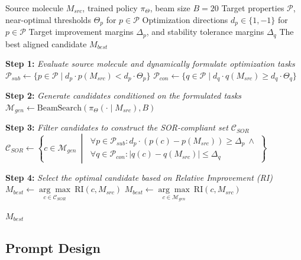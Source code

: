 \documentclass[11pt]{article}
\begin{document}
\begin{algorithm*}[t]
\caption{Candidate Selection}
\label{alg:beam_search}
\begin{algorithmic}[1]
\Require Source molecule $M_{src}$, trained policy $\pi_\Theta$, beam size $B=20$
\Require Target properties $\mathcal{P}$, near-optimal thresholds $\Theta_p$ for $p \in \mathcal{P}$
\Require Optimization directions $d_p \in \{1, -1\}$ for $p \in \mathcal{P}$ 
\Require Target improvement margins $\Delta_p$, and stability tolerance margins $\Delta_q$
\Ensure The best aligned candidate $M_{best}$

\State \textbf{Step 1:} \textit{Evaluate source molecule and dynamically formulate optimization tasks}
\State $\mathcal{P}_{sub} \leftarrow \{ p \in \mathcal{P} \mid d_p \cdot p(M_{src}) < d_p \cdot \Theta_p \}$ 
\State $\mathcal{P}_{con} \leftarrow \{ q \in \mathcal{P} \mid d_q \cdot q(M_{src}) \ge d_q \cdot \Theta_q \}$ 
\State

\State \textbf{Step 2:} \textit{Generate candidates conditioned on the formulated tasks}
\State $\mathcal{M}_{gen} \leftarrow \text{BeamSearch}(\pi_\Theta(\cdot \mid M_{src}), B)$ 
\State

\State \textbf{Step 3:} \textit{Filter candidates to construct the SOR-compliant set $\mathcal{C}_{SOR}$}
\State $\mathcal{C}_{SOR} \leftarrow \left\{ c \in \mathcal{M}_{gen} \ \middle| \ 
    \begin{array}{l}
        \forall p \in \mathcal{P}_{sub}: d_p \cdot (p(c) - p(M_{src})) \ge \Delta_p \ \land \\
        \forall q \in \mathcal{P}_{con}: |q(c) - q(M_{src})| \le \Delta_q
    \end{array}
\right\}$
\State

\State \textbf{Step 4:} \textit{Select the optimal candidate based on Relative Improvement (RI)}
\If{$\mathcal{C}_{SOR} \neq \emptyset$}
    \State $M_{best} \leftarrow \underset{c \in \mathcal{C}_{SOR}}{\arg\max} \ \text{RI}(c, M_{src})$
\Else
    \State $M_{best} \leftarrow \underset{c \in \mathcal{M}_{gen}}{\arg\max} \ \text{RI}(c, M_{src})$ 
\EndIf

\State \Return $M_{best}$
\end{algorithmic}
\end{algorithm*}




\subsection{Prompt Design}
\label{appendix:prompt}
\end{document}
